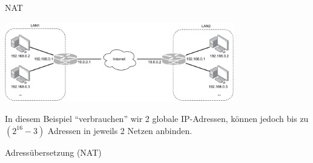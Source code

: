 \begin{example}{NAT}
    \begin{center}
        \includegraphics[width=0.75\textwidth]{includes/figures/defi_nat.pdf}
    \end{center}

    In diesem Beispiel \enquote{verbrauchen} wir 2 globale IP-Adressen, können jedoch bis zu $(2^{16} - 3)$ Adressen in jeweils 2 Netzen anbinden.
\end{example}

\begin{defi}{Adressübersetzung (NAT)}

\end{defi}